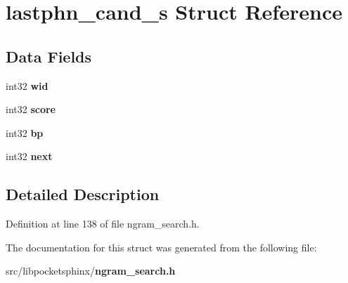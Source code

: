 \section{lastphn\+\_\+cand\+\_\+s Struct Reference}
\label{structlastphn__cand__s}
\subsection*{Data Fields}
\begin{DoxyCompactItemize}
\item 
int32 {\bfseries wid}\label{structlastphn__cand__s_af8f9fa3e4b6b7e2295d7a437b6f754c3}

\item 
int32 {\bfseries score}\label{structlastphn__cand__s_af862094c7b2476c6a66dbc120b19775b}

\item 
int32 {\bfseries bp}\label{structlastphn__cand__s_aa1aeb014f9023a75c81813376115fbcc}

\item 
int32 {\bfseries next}\label{structlastphn__cand__s_a06dade75d757f45e5d43b4869d85bac9}

\end{DoxyCompactItemize}


\subsection{Detailed Description}


Definition at line 138 of file ngram\+\_\+search.\+h.



The documentation for this struct was generated from the following file\+:\begin{DoxyCompactItemize}
\item 
src/libpocketsphinx/{\bf ngram\+\_\+search.\+h}\end{DoxyCompactItemize}
